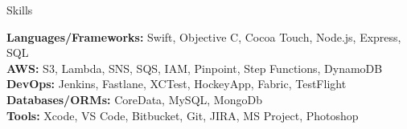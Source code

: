 \documentclass{resume} %
\begin{document}

\begin{rSection}{Skills}

    \textbf{Languages/Frameworks:} Swift, Objective C, Cocoa Touch, Node.js, Express, SQL  \\
    \textbf{AWS:} S3, Lambda, SNS, SQS, IAM, Pinpoint, Step Functions, DynamoDB  \\
    \textbf{DevOps:} Jenkins, Fastlane, XCTest, HockeyApp, Fabric, TestFlight \\
    \textbf{Databases/ORMs:} CoreData, MySQL, MongoDb  \\
    \textbf{Tools:} Xcode, VS Code, Bitbucket, Git, JIRA, MS Project, Photoshop  \\
    
    \end{rSection}
\end{document}
